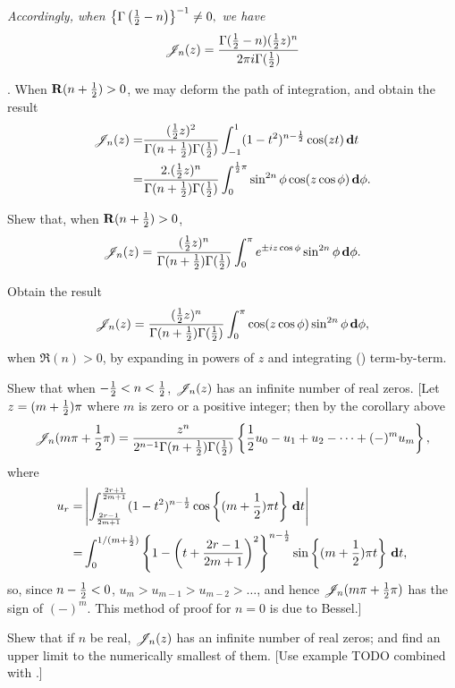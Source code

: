 \emph{Accordingly, when
  $
  \left\{ \Gamma\left( \frac{1}{2}-n \right) \right\}^{-1} \neq 0,
  $
  we have
}
$$
\mathscr{J}_{n}(z)
=
\frac{ \Gamma(\frac{1}{2}-n) (\frac{1}{2} z)^{n} }{ 2\pi i \Gamma(\frac{1}{2})}
$$

\corollary. When $\operatorname{\mathbf{R}}(n+\frac{1}{2}) > 0$, we may deform the path of
integration, and obtain the result
\begin{align*}
  \mathscr{J}_{n}(z)
  =&
  \frac{ (\frac{1}{2} z)^{2} }{ \Gamma(n+\frac{1}{2}) \Gamma(\frac{1}{2}) }
  \int_{-1}^{1} (1-t^{2})^{n-\frac{1}{2}} \cos(zt) \, \mathbf{d} t
  \\
  =&
  \frac{2 . (\frac{1}{2} z)^{n} }{ \Gamma(n+\frac{1}{2}) \Gamma(\frac{1}{2}) }
  \int_{0}^{\frac{1}{2} \pi} \sin^{2n}\phi \cos(z \cos\phi) \, \mathbf{d}\phi.
\end{align*}
\begin{wandwexample}
  Shew that, when $\operatorname{\mathbf{R}}(n+\frac{1}{2}) > 0$,
  $$
  \mathscr{J}_{n}(z)
  =
  \frac{ (\frac{1}{2} z)^{n} }{ \Gamma(n+\frac{1}{2}) \Gamma(\frac{1}{2}) }
  \int_{0}^{\pi} e^{\pm iz\cos\phi} \sin^{2n}\phi \, \mathbf{d}\phi.
  $$
\end{wandwexample}
\begin{wandwexample}
  Obtain the result
  $$
  \mathscr{J}_{n}(z)
  =
  \frac{ (\frac{1}{2} z)^{n} }{ \Gamma(n+\frac{1}{2}) \Gamma(\frac{1}{2}) }
  \int_{0}^{\pi} \cos(z\cos\phi) \sin^{2n}\phi \, \mathbf{d}\phi,
  $$
  when $\Re(n) > 0$, by expanding in powers of $z$ and
  integrating
  () term-by-term.
\end{wandwexample}
%
%
\begin{wandwexample}
  Shew that when $-\frac{1}{2} < n < \frac{1}{2}$, $\mathscr{J}_{n}(z)$ has an infinite number
  of real zeros. [Let $z = (m+\frac{1}{2})\pi$ where $m$ is zero or a
  positive integer; then by the corollary above
  $$
  \mathscr{J}_{n}(m\pi + \frac{1}{2}\pi)
  =
  \frac{z^{n}}{2^{n-1} \Gamma(n+\frac{1}{2}) \Gamma(\frac{1}{2})}
  \left\{  \frac{1}{2} u_{0} - u_{1} + u_{2} - \cdots + (-)^{m} u_{m} \right\},
  $$
  where
  \begin{align*}
    u_{r}
    =&
    \left| 
      \int_{\frac{2r-1}{2m+1}}^{\frac{2r+1}{2m+1}}
      (1-t^{2})^{n-\frac{1}{2}} \cos \left\{ (m+\frac{1}{2})\pi t \right\}
      \, \mathbf{d} t
     \right|
    \\
    =&
    \int_{0}^{1/(m+\frac{1}{2})}
    \left\{ 
      1
      -
      \left( t + \frac{2r-1}{2m+1} \right)^{2}
     \right\}^{n-\frac{1}{2}}
    \sin\left\{  (m+\frac{1}{2})\pi t  \right\}
    \, \mathbf{d} t,
  \end{align*}
  so, since $n - \frac{1}{2} < 0$, $u_{m} > u_{m-1} > u_{m-2} > \ldots$, and
  hence $\mathscr{J}_{n}(m\pi + \frac{1}{2}\pi)$ has the sign of $(-)^{m}$.
  This method of proof for $n=0$ is due to Bessel.]
\end{wandwexample}
\begin{wandwexample}
  Shew that if $n$ be real, $\mathscr{J}_{n}(z)$ has an infinite number of real
  zeros; and find an upper limit to the numerically smallest of them.
  [Use example TODO combined with .]
\end{wandwexample}

